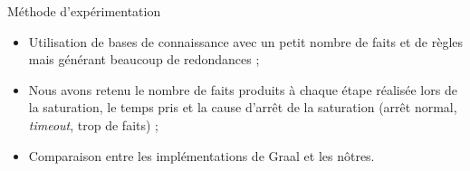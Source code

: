 \begin{frame}{Méthode d'expérimentation}
    \begin{itemize}
        \item Utilisation de bases de connaissance avec un petit nombre de faits et de règles mais générant beaucoup de redondances ;
        \item Nous avons retenu le nombre de faits produits à chaque étape réalisée lors de la saturation, le temps pris et la cause d'arrêt de la saturation (arrêt normal, \textit{timeout}, trop de faits) ;
        \item Comparaison entre les implémentations de Graal et les nôtres.
    \end{itemize}
    
    
\end{frame}


